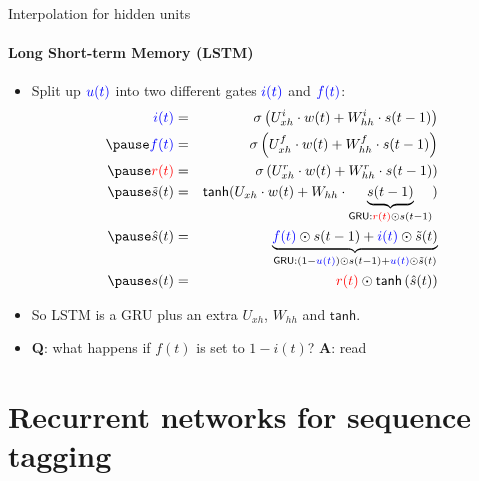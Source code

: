 \begin{frame}{Interpolation for hidden units}
\framesubtitle{Long Short-term Memory (LSTM)}
\begin{itemize}[<+->]
	\item Split up $\textcolor{blue}{u(t)}$ into two different gates $\textcolor{blue}{i(t)}$ and $\textcolor{blue}{f(t)}$:
	\begin{eqnarray*}
		\textcolor{blue}{i(t)} &=& \sigma\left( U^i_{xh} \cdot w(t) + W^i_{hh} \cdot s(t-1) \right)  \\ \pause
		\textcolor{blue}{f(t)} &=& \sigma\left( U^f_{xh} \cdot w(t) + W^f_{hh} \cdot s(t-1) \right)  \\ \pause
		\textcolor{red}{r(t)} &=& \sigma\left( U^r_{xh} \cdot w(t) + W^r_{hh} \cdot s(t-1) \right) \\ \pause 
		\tilde{s}(t) &=& \textsf{tanh}(U_{xh} \cdot w(t) + W_{hh} \cdot \underbrace{s(t-1)}_{\textsf{GRU}: \textcolor{red}{r(t)} \odot s(t-1)} ) \\ \pause 
		\hat{s}(t) &=& \underbrace{\textcolor{blue}{f(t)} \odot s(t-1) + \textcolor{blue}{i(t)} \odot \tilde{s}(t)}_{\textsf{GRU}: (1-\textcolor{blue}{u(t)}) \odot s(t-1) + \textcolor{blue}{u(t)} \odot \tilde{s}(t)} \\ \pause 
		s(t) &=& \textcolor{red}{r(t)} \odot \textsf{tanh}\left( \hat{s}(t) \right) 
	\end{eqnarray*}
	\item So LSTM is a GRU plus an extra $U_{xh}$, $W_{hh}$ and $\textsf{tanh}$.
	\item \textbf{Q}: what happens if $f(t)$ is set to $1 - i(t)$? \pause \textbf{A}: read~\cite{Greff2017}
\end{itemize}
\end{frame}

\newcommand{\postag}[1]{{\color{red}/#1}}
\newcommand{\nertag}[1]{{\color{blue}/#1}}

\section{Recurrent networks for sequence tagging}

